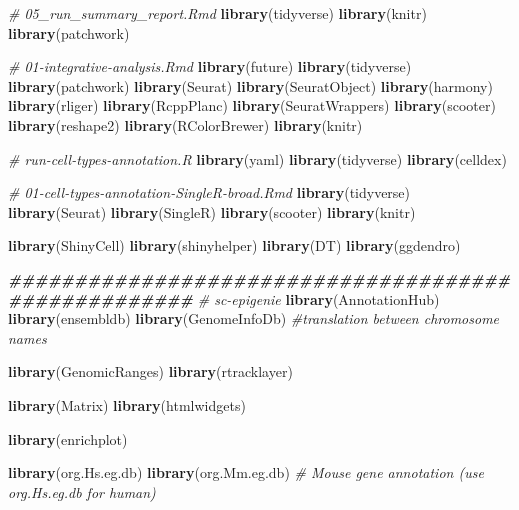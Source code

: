 \documentclass[
  11pt,
  a4paper,
]{article}
\newenvironment{Shaded}{\begin{snugshade}}{\end{snugshade}}
\newcommand{\CommentTok}[1]{\textcolor[rgb]{0.56,0.35,0.01}{\textit{#1}}}
\newcommand{\DocumentationTok}[1]{\textcolor[rgb]{0.56,0.35,0.01}{\textbf{\textit{#1}}}}
\newcommand{\FunctionTok}[1]{\textcolor[rgb]{0.13,0.29,0.53}{\textbf{#1}}}
\newcommand{\NormalTok}[1]{#1}
\begin{document}
\begin{Shaded}
\begin{Highlighting}[]
  \CommentTok{\# 05\_run\_summary\_report.Rmd}
  \FunctionTok{library}\NormalTok{(tidyverse)  }
  \FunctionTok{library}\NormalTok{(knitr)}
  \FunctionTok{library}\NormalTok{(patchwork)}

  \CommentTok{\# 01{-}integrative{-}analysis.Rmd}
  \FunctionTok{library}\NormalTok{(future)}
  \FunctionTok{library}\NormalTok{(tidyverse)}
  \FunctionTok{library}\NormalTok{(patchwork)}
  \FunctionTok{library}\NormalTok{(Seurat)}
  \FunctionTok{library}\NormalTok{(SeuratObject)}
  \FunctionTok{library}\NormalTok{(harmony)}
  \FunctionTok{library}\NormalTok{(rliger)}
  \FunctionTok{library}\NormalTok{(RcppPlanc)}
  \FunctionTok{library}\NormalTok{(SeuratWrappers)}
  \FunctionTok{library}\NormalTok{(scooter)}
  \FunctionTok{library}\NormalTok{(reshape2)}
  \FunctionTok{library}\NormalTok{(RColorBrewer)}
  \FunctionTok{library}\NormalTok{(knitr)}
  
  \CommentTok{\# run{-}cell{-}types{-}annotation.R}
  \FunctionTok{library}\NormalTok{(yaml)}
  \FunctionTok{library}\NormalTok{(tidyverse)}
  \FunctionTok{library}\NormalTok{(celldex)}
  
  \CommentTok{\# 01{-}cell{-}types{-}annotation{-}SingleR{-}broad.Rmd}
  \FunctionTok{library}\NormalTok{(tidyverse)}
  \FunctionTok{library}\NormalTok{(Seurat)}
  \FunctionTok{library}\NormalTok{(SingleR)}
  \FunctionTok{library}\NormalTok{(scooter)}
  \FunctionTok{library}\NormalTok{(knitr)}

  
  \FunctionTok{library}\NormalTok{(ShinyCell)}
  \FunctionTok{library}\NormalTok{(shinyhelper)}
  \FunctionTok{library}\NormalTok{(DT)}
  \FunctionTok{library}\NormalTok{(ggdendro)}
  
  \DocumentationTok{\#\#\#\#\#\#\#\#\#\#\#\#\#\#\#\#\#\#\#\#\#\#\#\#\#\#\#\#\#\#\#\#\#\#\#\#\#\#\#\#\#\#\#\#\#\#\#\#\#\#\#\#}
  \CommentTok{\# sc{-}epigenie}
  \FunctionTok{library}\NormalTok{(AnnotationHub)}
  \FunctionTok{library}\NormalTok{(ensembldb)}
  \FunctionTok{library}\NormalTok{(GenomeInfoDb) }\CommentTok{\#translation between chromosome names}

  \FunctionTok{library}\NormalTok{(GenomicRanges)}
  \FunctionTok{library}\NormalTok{(rtracklayer)}

  \FunctionTok{library}\NormalTok{(Matrix)}
  \FunctionTok{library}\NormalTok{(htmlwidgets)}

  \FunctionTok{library}\NormalTok{(enrichplot)}

  \FunctionTok{library}\NormalTok{(org.Hs.eg.db)}
  \FunctionTok{library}\NormalTok{(org.Mm.eg.db) }\CommentTok{\# Mouse gene annotation (use org.Hs.eg.db for human)}
  

\end{Highlighting}
\end{Shaded}
\end{document}
